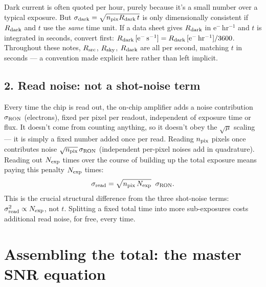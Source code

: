 \documentclass[11pt]{article}
\begin{document}
\begin{tcolorbox}[flagbox, title=FLAGGING AN AMBIGUITY IN THE UNITS]
Dark current is often quoted per hour, purely because it's a small number over a typical exposure. But
$\sigma_{\rm dark}=\sqrt{n_{\rm pix}R_{\rm dark}\,t}$ is only dimensionally consistent if $R_{\rm dark}$
and $t$ use the \emph{same} time unit. If a data sheet gives $R_{\rm dark}$ in $\mathrm{e^-\,hr^{-1}}$
and $t$ is integrated in seconds, convert first: $R_{\rm dark}\,[\mathrm{e^-\,s^{-1}}] = R_{\rm dark}\,
[\mathrm{e^-\,hr^{-1}}]/3600$. Throughout these notes, $R_{\rm src}$, $R_{\rm sky}$, $R_{\rm dark}$ are
all per second, matching $t$ in seconds --- a convention made explicit here rather than left implicit.
\end{tcolorbox}

\subsection*{2. Read noise: not a shot-noise term}
Every time the chip is read out, the on-chip
amplifier adds a noise contribution $\sigma_{\rm RON}$ (electrons), fixed per pixel per readout,
independent of exposure time or flux. It doesn't come from counting anything, so it doesn't obey the
$\sqrt{\mu}$ scaling --- it is simply a fixed number added once per read. Reading $n_{\rm pix}$ pixels
once contributes noise $\sqrt{n_{\rm pix}}\,\sigma_{\rm RON}$ (independent per-pixel noises add in
quadrature). Reading out $N_{\rm exp}$ times over the course of building up the total exposure means
paying this penalty $N_{\rm exp}$ times:
\begin{equation}
\sigma_{\rm read} = \sqrt{n_{\rm pix}\,N_{\rm exp}}\;\;\sigma_{\rm RON}.
\end{equation}
This is the crucial structural difference from the three shot-noise terms:
$\sigma_{\rm read}^2 \propto N_{\rm exp}$, not $t$. Splitting a fixed total time into more
sub-exposures costs additional read noise, for free, every time.

\section*{Assembling the total: the master SNR equation}
\end{document}
